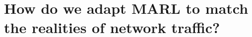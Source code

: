 \documentclass[aspectratio=169,xcolor={dvipsnames}
,hide notes
]{beamer}
\begin{document}
%	
%	
%	
%	
%

\section{How do we adapt MARL to match the realities of network traffic?}
\end{document}
